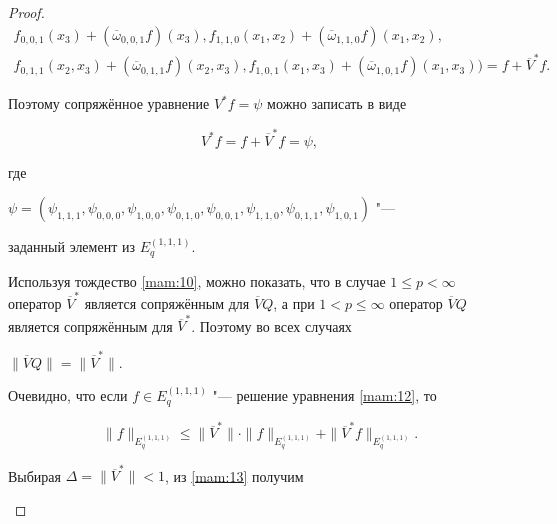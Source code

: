 \begin{proof}
\begin{multline*}
f_{0, 0, 1}( x_3) + ( \overline{\omega }_{0, 0, 1}f ) ( x_3), f_{1, 1, 0}( x_1 ,x_2 ) + (\overline{\omega }_{1, 1, 0}f) ( x_1 ,x_2 ), \\ f_{0, 1, 1}( x_2 ,x_3 ) + ( \overline{\omega }_{0, 1, 1}f) ( x_2 ,x_3 ) , f_{1, 0, 1}( x_1 ,x_3 ) +( \overline{\omega }

_{1, 0, 1}f) ( x_1 ,x_3 ) \bigr)=f+\overline{V}^{\ast }f.

\end{multline*}

Поэтому  сопряжённое уравнение $V^{\ast }f=\psi $ можно записать в виде

\begin{equation}

\label{mam:12}

V^{\ast }f=f+\overline{V}^{\ast }f=\psi,

\end{equation}

где

$\psi =\left( \psi _{1, 1, 1},\psi _{0, 0, 0},\psi _{1, 0, 0},\psi _{0, 1, 0},\psi_{0, 0, 1},\psi _{1, 1, 0},\psi _{0, 1, 1},\psi_{1, 0, 1}\right)

$ "---

заданный элемент из $E_{q}^{(1, 1, 1)}$.



Используя тождество \eqref{mam:10}, можно показать, что в случае $1\le p<\infty $ оператор $\overline{V}^{*} $ является сопряжённым для $\overline{V}Q$, а при $1<p\le \infty $ оператор $\overline{V}Q$ является сопряжённым для $\overline{V}^{*}$.  Поэтому во всех случаях 

$\|\overline{V}Q\| =\| \overline{V}^{\ast }\| $.



Очевидно, что если $f\in E_{q}^{(1, 1, 1) }$ "--- решение уравнения \eqref{mam:12}, то

\begin{equation}

\label{mam:13}

\| f\| _{E_{q}^{(1, 1, 1) }}\leq \| \overline{V}^{\ast }\| \cdot  \| f\| _{E_{q}^{(1, 1, 1) }}+\| \overline{V}^{\ast }f \|

_{E_{q}^{(1, 1, 1) }}.

\end{equation}

Выбирая $\Delta =\| \overline{V}^{\ast }\| <1$, из \eqref{mam:13} получим

\begin{equation*}


\end{equation*}
\end{proof}
